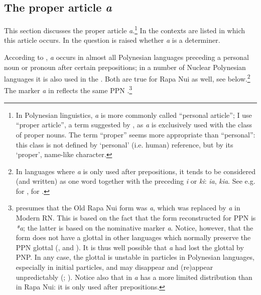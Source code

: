 \subsection{The proper article \textit{a}}\label{sec:5.13.2}
This section discusses the proper article \textit{a}.\footnote{\label{fn:278}In Polynesian linguistics, \textit{a} is more commonly called “personal article”; I use “proper article”, a term suggested by \citet[108]{Dixon2010-1}, as \textit{a} is exclusively used with the class of proper nouns. The term “proper” seems more appropriate than “personal”: this class is not defined by ‘personal’ (i.e. human) reference, but by its ‘proper’, name-like character.} In  the contexts are listed in which this article occurs. In  the question is raised whether \textit{a} is a determiner.

According to \citet[58]{Clark1976}, \textit{a} occurs in almost all Polynesian languages preceding a personal noun or pronoun after certain prepositions; in a number of Nuclear Polynesian languages it is also used in the . Both are true for Rapa Nui as well, see below.\footnote{\label{fn:279}In languages where \textit{a} is only used after prepositions, it tends to be considered (and written) as one word together with the preceding \textit{i} or \textit{ki}: \textit{ia}, \textit{kia}. See e.g. \citet[107]{ElbertPukui1979} for , \citet[186]{LazardPeltzer2000} for .} The  marker \textit{{\ꞌ}a} in  reflects the same PPN .\footnote{\label{fn:280}\citet[429]{Fischer1994} presumes that the Old Rapa Nui form was \textit{{\ꞌ}a}, which was replaced by  \textit{a} in Modern RN. This is based on the fact that the form reconstructed for PPN is \textit{*{\ꞌ}a}; the latter is based on the  nominative marker \textit{{\ꞌ}a}. Notice, however, that the form does not have a glottal in other languages which normally preserve the PPN glottal (,  and ). It is thus well possible that \textit{a} had lost the glottal by PNP. In any case, the glottal is unstable in particles in Polynesian languages, especially in initial particles, and may disappear and (re)appear unpredictably (; \citealt[20]{Clark1976}). Notice also that in  \textit{a} has a more limited distribution than in Rapa Nui: it is only used after prepositions.} 

